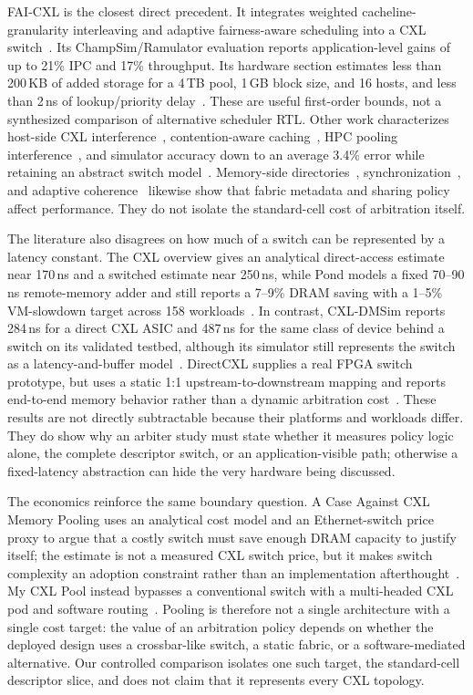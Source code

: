 FAI-CXL is the closest direct precedent. It integrates weighted cacheline-granularity interleaving and adaptive fairness-aware scheduling into a CXL switch~\cite{fai}. Its ChampSim/Ramulator evaluation reports application-level gains of up to 21\% IPC and 17\% throughput. Its hardware section estimates less than 200\,KB of added storage for a 4\,TB pool, 1\,GB block size, and 16 hosts, and less than 2\,ns of lookup/priority delay~\cite{fai}. These are useful first-order bounds, not a synthesized comparison of alternative scheduler RTL. Other work characterizes host-side CXL interference~\cite{cxl_interplay}, contention-aware caching~\cite{contention_cache}, HPC pooling interference~\cite{hpc_pool}, and simulator accuracy down to an average 3.4\% error while retaining an abstract switch model~\cite{cxldmsim}. Memory-side directories~\cite{redit}, synchronization~\cite{sync_cxl}, and adaptive coherence~\cite{rethinking_pool} likewise show that fabric metadata and sharing policy affect performance. They do not isolate the standard-cell cost of arbitration itself.

The literature also disagrees on how much of a switch can be represented by a latency constant. The CXL overview gives an analytical direct-access estimate near 170\,ns and a switched estimate near 250\,ns, while Pond models a fixed 70--90\,ns remote-memory adder and still reports a 7--9\% DRAM saving with a 1--5\% VM-slowdown target across 158 workloads~\cite{cxl_intro,pond}. In contrast, CXL-DMSim reports 284\,ns for a direct CXL ASIC and 487\,ns for the same class of device behind a switch on its validated testbed, although its simulator still represents the switch as a latency-and-buffer model~\cite{cxldmsim}. DirectCXL supplies a real FPGA switch prototype, but uses a static 1:1 upstream-to-downstream mapping and reports end-to-end memory behavior rather than a dynamic arbitration cost~\cite{directcxl}. These results are not directly subtractable because their platforms and workloads differ. They do show why an arbiter study must state whether it measures policy logic alone, the complete descriptor switch, or an application-visible path; otherwise a fixed-latency abstraction can hide the very hardware being discussed.

The economics reinforce the same boundary question. A Case Against CXL Memory Pooling uses an analytical cost model and an Ethernet-switch price proxy to argue that a costly switch must save enough DRAM capacity to justify itself; the estimate is not a measured CXL switch price, but it makes switch complexity an adoption constraint rather than an implementation afterthought~\cite{case_pool}. My CXL Pool instead bypasses a conventional switch with a multi-headed CXL pod and software routing~\cite{my_cxl_pool}. Pooling is therefore not a single architecture with a single cost target: the value of an arbitration policy depends on whether the deployed design uses a crossbar-like switch, a static fabric, or a software-mediated alternative. Our controlled comparison isolates one such target, the standard-cell descriptor slice, and does not claim that it represents every CXL topology.

